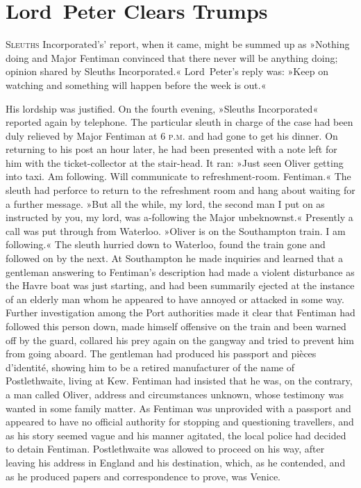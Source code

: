 \chapter{Lord~Peter Clears Trumps}
\lettrine[lines=4,ante=‘]{S}{leuths} Incorporated's' report, when it came, might be summed up as »Nothing doing and Major Fentiman convinced that there never will be anything doing; opinion shared by Sleuths Incorporated.« Lord~Peter's reply was: »Keep on watching and something will happen before the week is out.«

His lordship was justified. On the fourth evening, »Sleuths Incorporated« reported again by telephone. The particular sleuth in charge of the case had been duly relieved by Major Fentiman at 6 \textsc{p.m.} and had gone to get his dinner. On returning to his post an hour later, he had been presented with a note left for him with the ticket-collector at the stair-head. It ran: »Just seen Oliver getting into taxi. Am following. Will communicate to refreshment-room. Fentiman.« The sleuth had perforce to return to the refreshment room and hang about waiting for a further message. »But all the while, my lord, the second man I put on as instructed by you, my lord, was a-following the Major unbeknownst.« Presently a call was put through from Waterloo. »Oliver is on the Southampton train. I am following.« The sleuth hurried down to Waterloo, found the train gone and followed on by the next. At Southampton he made inquiries and learned that a gentleman answering to Fentiman's description had made a violent disturbance as the Havre boat was just starting, and had been summarily ejected at the instance of an elderly man whom he appeared to have annoyed or attacked in some way. Further investigation among the Port authorities made it clear that Fentiman had followed this person down, made himself offensive on the train and been warned off by the guard, collared his prey again on the gangway and tried to prevent him from going aboard. The gentleman had produced his passport and pièces d'identité, showing him to be a retired manufacturer of the name of Postlethwaite, living at Kew. Fentiman had insisted that he was, on the contrary, a man called Oliver, address and circumstances unknown, whose testimony was wanted in some family matter. As Fentiman was unprovided with a passport and appeared to have no official authority for stopping and questioning travellers, and as his story seemed vague and his manner agitated, the local police had decided to detain Fentiman. Postlethwaite was allowed to proceed on his way, after leaving his address in England and his destination, which, as he contended, and as he produced papers and correspondence to prove, was Venice.

